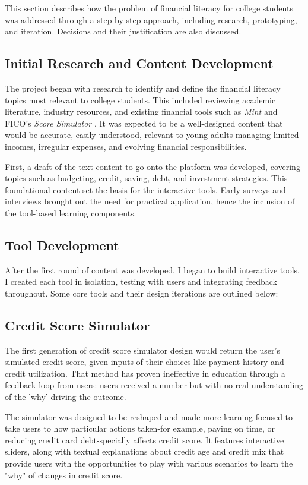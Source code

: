 \documentclass[11pt,twocolumn]{article}
\begin{document}
This section describes how the problem of financial literacy for college students was addressed through a step-by-step approach, including research, prototyping, and iteration. Decisions and their justification are also discussed.

\subsection{Initial Research and Content Development}
The project began with  research to identify and define the financial literacy topics most relevant to college students. This included reviewing academic literature, industry resources, and existing financial tools such as \textit{Mint} and FICO’s \textit{Score Simulator} \cite{mint, fico}. It was expected to be a well-designed content that would be accurate, easily understood, relevant to young adults managing limited incomes, irregular expenses, and evolving financial responsibilities.

First, a draft of the text content to go onto the platform was developed, covering topics such as budgeting, credit, saving, debt, and investment strategies. This foundational content set the basis for the interactive tools. Early surveys and interviews brought out the need for practical application, hence the inclusion of the tool-based learning components.

\subsection{Tool Development}
After the first round of content was developed, I began to build interactive tools. I created each tool in isolation, testing with users and integrating feedback throughout. Some core tools and their design iterations are outlined below:

\subsection{Credit Score Simulator}

The first generation of credit score simulator design would return the user's simulated credit score, given inputs of their choices like payment history and credit utilization. That method has proven ineffective in education through a feedback loop from users: users received a number but with no real understanding of the 'why' driving the outcome.

The simulator was designed to be reshaped and made more learning-focused to take users to how particular actions taken-for example, paying on time, or reducing credit card debt-specially affects credit score. It features interactive sliders, along with textual explanations about credit age and credit mix that provide users with the opportunities to play with various scenarios to learn the "why" of changes in credit score.
\end{document}
